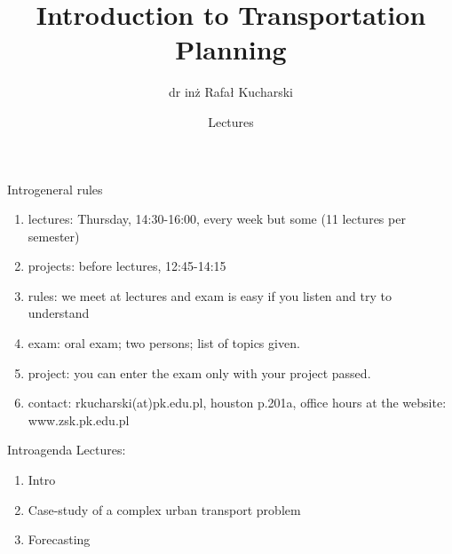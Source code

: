 \documentclass[11pt]{beamer}
\author{dr in\.{z} Rafał Kucharski}
\title{Introduction to Transportation Planning }
\institute{Department of Transport Systems \\ Politechnika Krakowska \\ Oct 2017}
\date{Lectures}
\begin{document}
\begin{frame}
\titlepage
\end{frame}

\begin{frame}{Intro}{general rules}
\begin{enumerate}
\item lectures: \alert{Thursday, 14:30-16:00, every week but some (11 lectures per semester) } \pause
\item projects: \alert{before lectures, 12:45-14:15} \pause
\item rules: \alert{we meet at lectures and exam is easy if you listen and try to understand} \pause
\item exam: \alert{oral exam; two persons; list of topics given.} \pause
\item project: \alert{you can enter the exam only with your project passed}. \pause
\item contact: \alert{rkucharski(at)pk.edu.pl, houston p.201a, office hours at the website: www.zsk.pk.edu.pl }
\end{enumerate}
\end{frame}

\begin{frame}{Intro}{agenda}
Lectures:
\begin{enumerate}
\item Intro
\item Case-study of a complex urban transport problem 
\item Forecasting
\end{enumerate}
\end{frame}
\end{document}
